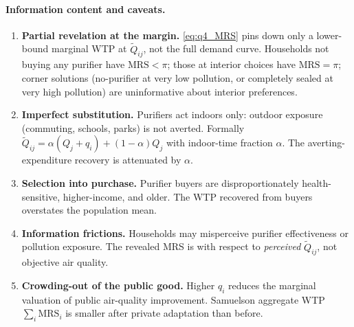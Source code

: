 \documentclass[11pt,a4paper]{article}
\begin{document}
\paragraph{Information content and caveats.}
\begin{enumerate}[leftmargin=*,itemsep=2pt]
    \item \textbf{Partial revelation at the margin.} \eqref{eq:q4_MRS} pins down only a lower-bound marginal WTP at $\tilde Q_{ij}$, not the full demand curve. Households not buying any purifier have $\mathrm{MRS}<\pi$; those at interior choices have $\mathrm{MRS}=\pi$; corner solutions (no-purifier at very low pollution, or completely sealed at very high pollution) are uninformative about interior preferences.
    \item \textbf{Imperfect substitution.} Purifiers act indoors only: outdoor exposure (commuting, schools, parks) is not averted. Formally $\tilde Q_{ij}=\alpha(Q_{j}+q_{i})+(1-\alpha)Q_{j}$ with indoor-time fraction $\alpha$. The averting-expenditure recovery is attenuated by $\alpha$.
    \item \textbf{Selection into purchase.} Purifier buyers are disproportionately health-sensitive, higher-income, and older. The WTP recovered from buyers overstates the population mean.
    \item \textbf{Information frictions.} Households may misperceive purifier effectiveness or pollution exposure. The revealed MRS is with respect to \emph{perceived} $\tilde Q_{ij}$, not objective air quality.
    \item \textbf{Crowding-out of the public good.} Higher $q_{i}$ reduces the marginal valuation of public air-quality improvement. Samuelson aggregate WTP $\sum_{i}\mathrm{MRS}_{i}$ is smaller after private adaptation than before.
\end{enumerate}
\end{document}
